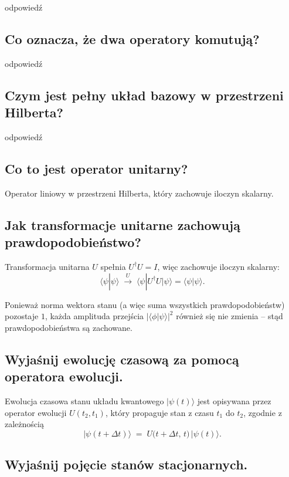 odpowiedź

\subsection{Co oznacza, że dwa operatory komutują?}

odpowiedź

\subsection{Czym jest pełny układ bazowy w przestrzeni Hilberta?}

odpowiedź

\subsection{Co to jest operator unitarny?}

Operator liniowy w przestrzeni Hilberta, który zachowuje iloczyn skalarny.

\subsection{Jak transformacje unitarne zachowują prawdopodobieństwo?}

Transformacja unitarna $U$ spełnia $U^\dagger U = I$, więc zachowuje iloczyn skalarny:
\[
\langle \psi | \psi \rangle
\;\xrightarrow{\,U\,}\;
\langle \psi | U^\dagger U | \psi \rangle
= \langle \psi | \psi \rangle.
\]

Ponieważ norma wektora stanu (a więc suma wszystkich prawdopodobieństw) pozostaje $1$, każda amplituda przejścia 
$|\langle \phi | \psi \rangle|^{2}$ również się nie zmienia – stąd prawdopodobieństwa są zachowane.

\subsection{Wyjaśnij ewolucję czasową za pomocą operatora ewolucji.}

Ewolucja czasowa stanu układu kwantowego \(\lvert \psi(t) \rangle\) jest opisywana przez operator ewolucji \(U(t_{2},t_{1})\), który propaguje stan z czasu \(t_{1}\) do \(t_{2}\), zgodnie z zależnością
\[
\lvert \psi(t+\Delta t) \rangle \;=\; U\bigl(t+\Delta t,\,t\bigr)\,\lvert \psi(t) \rangle.
\]

\subsection{Wyjaśnij pojęcie stanów stacjonarnych.}

